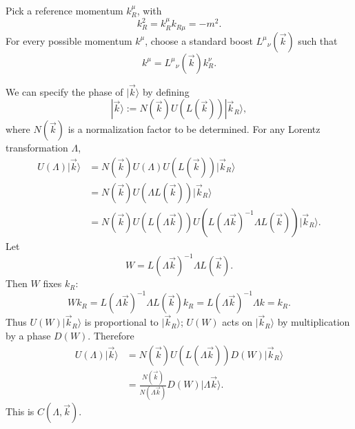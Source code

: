 Pick a reference momentum \(k_R^\mu\), with
\[
  k_R^2=k_R^\mu k_{R\mu}=-m^2.
\]
For every possible momentum \(k^\mu\), choose a standard boost
\(L^\mu{}_\nu(\vec k)\) such that
\[
  k^\mu=L^\mu{}_\nu(\vec k)k_R^\nu .
\]

\begin{center}
\end{center}

We can specify the phase of \(|\vec k\rangle\) by defining
\[
  |\vec k\rangle
  :=
  N(\vec k)U(L(\vec k))|\vec k_R\rangle,
\]
where \(N(\vec k)\) is a normalization factor to be determined. For any
Lorentz transformation \(\Lambda\),
\[
\begin{aligned}
  U(\Lambda)|\vec k\rangle
  &=
  N(\vec k)U(\Lambda)U(L(\vec k))|\vec k_R\rangle  \\
  &=
  N(\vec k)U(\Lambda L(\vec k))|\vec k_R\rangle  \\
  &=
  N(\vec k)
  U(L(\Lambda\vec k))
  U(L(\Lambda\vec k)^{-1}\Lambda L(\vec k))
  |\vec k_R\rangle .
\end{aligned}
\]
Let
\[
  W=L(\Lambda\vec k)^{-1}\Lambda L(\vec k).
\]
Then \(W\) fixes \(k_R\):
\[
  Wk_R
  =
  L(\Lambda\vec k)^{-1}\Lambda L(\vec k)k_R
  =
  L(\Lambda\vec k)^{-1}\Lambda k
  =
  k_R.
\]
Thus \(U(W)|\vec k_R\rangle\) is proportional to \(|\vec k_R\rangle\);
\(U(W)\) acts on \(|\vec k_R\rangle\) by multiplication by a phase
\(D(W)\). Therefore
\[
\begin{aligned}
  U(\Lambda)|\vec k\rangle
  &=
  N(\vec k)U(L(\Lambda\vec k))D(W)|\vec k_R\rangle  \\
  &=
  \frac{N(\vec k)}{N(\Lambda\vec k)}
  D(W)|\Lambda\vec k\rangle .
\end{aligned}
\]
This is \(C(\Lambda,\vec k)\).

